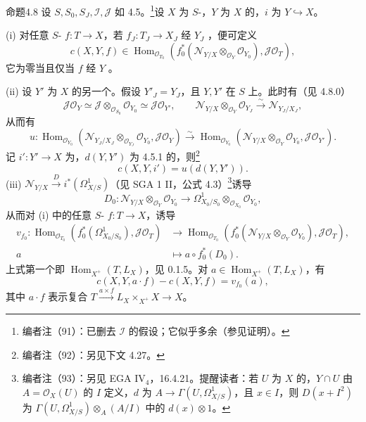 \begin{SGAresult}{命题}{4.8}
设 $S,S_0,S_J,\mathscr I,\mathscr J$ 如 4.5。\footnote{编者注（91）：已删去 $\mathscr I$ 的假设；它似乎多余（参见证明）。}设 $X$ 为 $S$-，$Y$ 为 $X$ 的，$i$ 为 $Y\hookrightarrow X$。

(i) 对任意 $S$- $f:T\to X$，若 $f_J:T_J\to X_J$ 经 $Y_J$ ，便可定义
\[c(X,Y,f)\in\operatorname{Hom}_{\mathscr O_{T_0}}(f_0^*(\mathscr N_{Y/X}\otimes_{\mathscr O_Y}\mathscr O_{Y_0}),\mathscr J\mathscr O_T),\tag{$*$}\]
它为零当且仅当 $f$ 经 $Y$ 。

(ii) 设 $Y'$ 为 $X$ 的另一个。假设 $Y'_J=Y_J$，且 $Y,Y'$ 在 $S$ 上。此时有（见 4.8.0）
\[\mathscr J\mathscr O_Y\simeq\mathscr J\otimes_{\mathscr O_{S_0}}\mathscr O_{Y_0}\simeq\mathscr J\mathscr O_{Y'},\qquad \mathscr N_{Y/X}\otimes_{\mathscr O_Y}\mathscr O_{Y_J}\xrightarrow\sim\mathscr N_{Y_J/X_J},\]
从而有
\[u:\operatorname{Hom}_{\mathscr O_{Y_0}}(\mathscr N_{Y_J/X_J}\otimes_{\mathscr O_{Y_J}}\mathscr O_{Y_0},\mathscr J\mathscr O_Y)\xrightarrow\sim\operatorname{Hom}_{\mathscr O_{Y_0}}(\mathscr N_{Y/X}\otimes_{\mathscr O_Y}\mathscr O_{Y_0},\mathscr J\mathscr O_{Y'}).\]
记 $i':Y'\to X$ 为，$d(Y,Y')$ 为 4.5.1 的，则\footnote{编者注（92）：另见下文 4.27。}
\[c(X,Y,i')=u(d(Y,Y')).\tag{$**$}\]
(iii)  $\mathscr N_{Y/X}\xrightarrow D i^*(\Omega^1_{X/S})$（见 SGA 1 II，公式 4.3）\footnote{编者注（93）：另见 EGA IV$_4$，16.4.21。提醒读者：若 $U$ 为 $X$ 的，$Y\cap U$ 由 $A=\mathscr O_X(U)$ 的 $I$ 定义，$d$ 为 $A\to\Gamma(U,\Omega^1_{X/S})$，且 $x\in I$，则 $D(x+I^2)$ 为 $\Gamma(U,\Omega^1_{X/S})\otimes_A(A/I)$ 中的 $d(x)\otimes1$。}诱导
\[D_0:\mathscr N_{Y/X}\otimes_{\mathscr O_Y}\mathscr O_{Y_0}\longrightarrow\Omega^1_{X_0/S_0}\otimes_{\mathscr O_{X_0}}\mathscr O_{Y_0},\]
从而对 (i) 中的任意 $S$- $f:T\to X$，诱导
\[
\begin{aligned}
v_{f_0}:\operatorname{Hom}_{\mathscr O_{T_0}}(f_0^*(\Omega^1_{X_0/S_0}),\mathscr J\mathscr O_T)&\longrightarrow\operatorname{Hom}_{\mathscr O_{T_0}}(f_0^*(\mathscr N_{Y/X}\otimes_{\mathscr O_Y}\mathscr O_{Y_0}),\mathscr J\mathscr O_T),\\
a&\longmapsto a\circ f_0^*(D_0).
\end{aligned}
\]
上式第一个即 $\operatorname{Hom}_{X^+}(T,L_X)$，见 0.1.5。对 $a\in\operatorname{Hom}_{X^+}(T,L_X)$，有
\[c(X,Y,a\cdot f)-c(X,Y,f)=v_{f_0}(a),\tag{$***$}\]
其中 $a\cdot f$ 表示复合 $T\xrightarrow{a\times f}L_X\times_{X^+}X\to X$。
\end{SGAresult}
